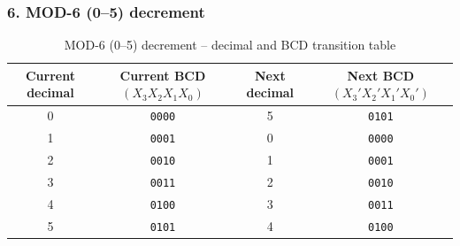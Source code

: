 \documentclass[12pt,letterpaper]{article}
\begin{document}
\subsubsection{6. MOD-6 (0--5) decrement}
\begin{table}[H]\centering
\caption{MOD-6 (0--5) decrement -- decimal and BCD transition table}
\label{tab:kmap-mod6-dec-trans}
\scriptsize
\begin{tabular}{c c c c}\toprule
Current decimal & Current BCD $(X_3X_2X_1X_0)$ & Next decimal & Next BCD $(X_3'X_2'X_1'X_0')$ \\
\midrule
0 & \texttt{0000} & 5 & \texttt{0101} \\
1 & \texttt{0001} & 0 & \texttt{0000} \\
2 & \texttt{0010} & 1 & \texttt{0001} \\
3 & \texttt{0011} & 2 & \texttt{0010} \\
4 & \texttt{0100} & 3 & \texttt{0011} \\
5 & \texttt{0101} & 4 & \texttt{0100} \\
\bottomrule
\end{tabular}
\end{table}
\end{document}
